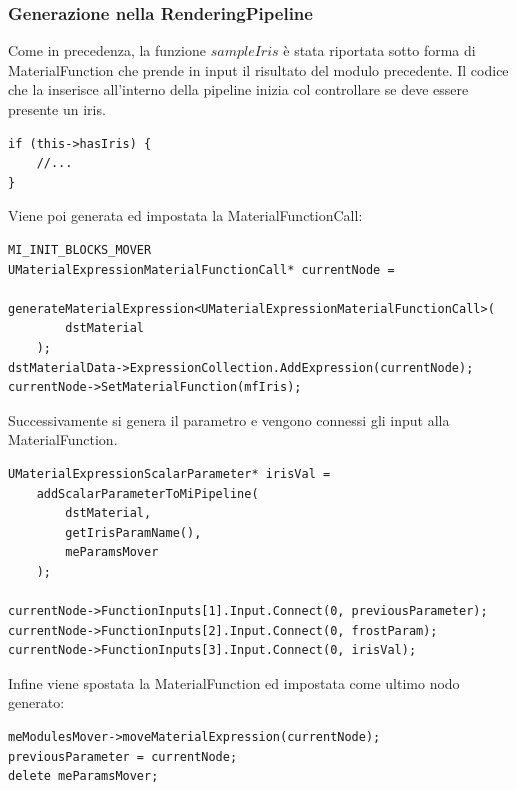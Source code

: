 \documentclass[main.tex]{subfiles}
\begin{document}
\subsubsection{Generazione nella RenderingPipeline}\label{subsec:5_2_IrisRenderingPipeline}
Come in precedenza, la funzione $sampleIris$ è stata riportata sotto forma di MaterialFunction che prende in input il risultato del modulo precedente. Il codice che la inserisce all'interno della pipeline inizia col controllare se deve essere presente un iris.
\begin{lstlisting}
if (this->hasIris) {
    //...
}
\end{lstlisting}

Viene poi generata ed impostata la MaterialFunctionCall:
\begin{lstlisting}
MI_INIT_BLOCKS_MOVER
UMaterialExpressionMaterialFunctionCall* currentNode =
    generateMaterialExpression<UMaterialExpressionMaterialFunctionCall>(
        dstMaterial
    );
dstMaterialData->ExpressionCollection.AddExpression(currentNode);
currentNode->SetMaterialFunction(mfIris);
\end{lstlisting}
Successivamente si genera il parametro e vengono connessi gli input alla MaterialFunction.
\begin{lstlisting}
UMaterialExpressionScalarParameter* irisVal =
    addScalarParameterToMiPipeline(
        dstMaterial,
        getIrisParamName(),
        meParamsMover
    );

currentNode->FunctionInputs[1].Input.Connect(0, previousParameter);
currentNode->FunctionInputs[2].Input.Connect(0, frostParam);
currentNode->FunctionInputs[3].Input.Connect(0, irisVal);
\end{lstlisting}
Infine viene spostata la MaterialFunction ed impostata come ultimo nodo generato:
\begin{lstlisting}
meModulesMover->moveMaterialExpression(currentNode);
previousParameter = currentNode;
delete meParamsMover;
\end{lstlisting}
\end{document}

